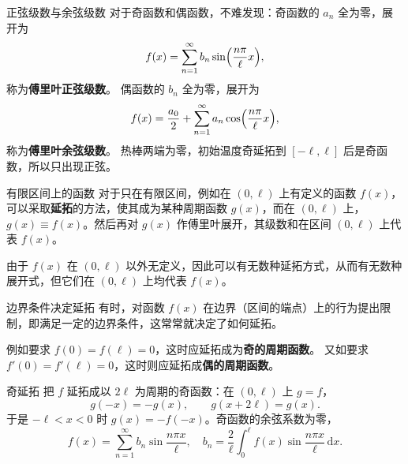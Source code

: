 \documentclass[fontset=windows, chinese, 10pt, xcolor=dvipsnames]{beamer}
\begin{document}
\begin{frame}{正弦级数与余弦级数}
  对于奇函数和偶函数，不难发现：奇函数的 $a_n$ 全为零，展开为
  \begin{equation*}
    f(x)=\sum_{n=1}^{\infty}
      b_n\sin\Bigl(\frac{n\pi}{\ell}x\Bigr),
  \end{equation*}
  称为\textbf{傅里叶正弦级数}。
  偶函数的 $b_n$ 全为零，展开为
  \begin{equation*}
    f(x)=\frac{a_0}{2}+\sum_{n=1}^{\infty}
      a_n\cos\Bigl(\frac{n\pi}{\ell}x\Bigr),
  \end{equation*}
  称为\textbf{傅里叶余弦级数}。
  热棒两端为零，初始温度奇延拓到 $[-\ell,\ell]$ 后是奇函数，所以只出现正弦。
\end{frame}

\begin{frame}{有限区间上的函数}
  对于只在有限区间，例如在 $(0,\ell)$ 上有定义的函数 $f(x)$，可以采取\textbf{延拓}的方法，使其成为某种周期函数 $g(x)$，而在 $(0,\ell)$ 上，$g(x)\equiv f(x)$。然后再对 $g(x)$ 作傅里叶展开，其级数和在区间 $(0,\ell)$ 上代表 $f(x)$。
  \vspace{0.5em}

  由于 $f(x)$ 在 $(0,\ell)$ 以外无定义，因此可以有无数种延拓方式，从而有无数种展开式，但它们在 $(0,\ell)$ 上均代表 $f(x)$。
\end{frame}

\begin{frame}{边界条件决定延拓}
  有时，对函数 $f(x)$ 在边界（区间的端点）上的行为提出限制，即满足一定的边界条件，这常常就决定了如何延拓。
  \vspace{0.4em}

  例如要求 $f(0)=f(\ell)=0$，这时应延拓成为\textbf{奇的周期函数}。
  又如要求 $f'(0)=f'(\ell)=0$，这时则应延拓成\textbf{偶的周期函数}。
\end{frame}

\begin{frame}{奇延拓}
  把 $f$ 延拓成以 $2\ell$ 为周期的奇函数：在 $(0,\ell)$ 上 $g=f$，
  \begin{equation*}
    g(-x)=-g(x),
    \qquad
    g(x+2\ell)=g(x).
  \end{equation*}
  于是 $-\ell<x<0$ 时 $g(x)=-f(-x)$。奇函数的余弦系数为零，
  \begin{equation*}
    f(x)=\sum_{n=1}^{\infty} b_n\sin\frac{n\pi x}{\ell},
    \quad
    b_n=\frac{2}{\ell}\int_0^{\ell} f(x)\sin\frac{n\pi x}{\ell}\,\mathrm{d}x.
  \end{equation*}
\end{frame}
\end{document}
